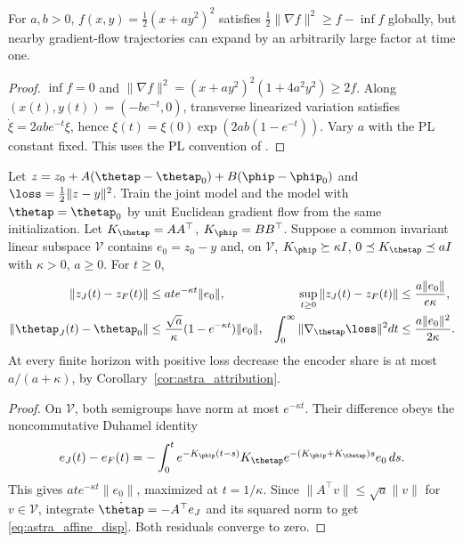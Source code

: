 \begin{proposition}
\label{prop:astra_pl_counter}
For $a,b>0$, $f(x,y)=\frac12(x+ay^2)^2$ satisfies
$\frac12\|\nabla f\|^2\ge f-\inf f$ globally, but nearby gradient-flow
trajectories can expand by an arbitrarily large factor at time one.
\end{proposition}
\begin{proof}
$\inf f=0$ and $\|\nabla f\|^2=(x+ay^2)^2(1+4a^2y^2)\ge2f$.
Along $(x(t),y(t))=(-be^{-t},0)$, transverse linearized variation satisfies
$\dot\xi=2abe^{-t}\xi$, hence
$\xi(t)=\xi(0)\exp(2ab(1-e^{-t}))$. Vary $a$ with the PL constant fixed.
This uses the PL convention of \citet{astra_karimi2016}.
\end{proof}

\begin{theorem}
\label{thm:astra_affine}
Let $z=z_0+A(\thetap-\thetap_0)+B(\phip-\phip_0)$ and
$\loss=\frac12\|z-y\|^2$. Train the joint model and the model with
$\thetap=\thetap_0$ by unit Euclidean gradient flow from the same
initialization. Let $K_\thetap=AA^\top$, $K_\phip=BB^\top$.
Suppose a common invariant linear subspace $\mathcal V$ contains
$e_0=z_0-y$ and, on $\mathcal V$,
$K_\phip\succeq\kappa I$, $0\preceq K_\thetap\preceq aI$ with
$\kappa>0$, $a\ge0$. For $t\ge0$,
\begin{align}
 \|z_J(t)-z_F(t)\|&\le at e^{-\kappa t}\|e_0\|,
 &\sup_{t\ge0}\|z_J(t)-z_F(t)\|&\le\frac{a\|e_0\|}{e\kappa},
 \label{eq:astra_affine_gap}\\
 \|\thetap_J(t)-\thetap_0\|&\le
 \frac{\sqrt a}{\kappa}(1-e^{-\kappa t})\|e_0\|,
 &\int_0^\infty\|\nabla_\thetap\loss\|^2dt&\le
 \frac{a\|e_0\|^2}{2\kappa}.\label{eq:astra_affine_disp}
\end{align}
At every finite horizon with positive loss decrease the encoder share
is at most $a/(a+\kappa)$, by Corollary~\ref{cor:astra_attribution}.
\end{theorem}
\begin{proof}
On $\mathcal V$, both semigroups have norm at most $e^{-\kappa t}$.
Their difference obeys the noncommutative Duhamel identity
\[
 e_J(t)-e_F(t)=-\int_0^t e^{-K_\phip(t-s)}K_\thetap
                e^{-(K_\phip+K_\thetap)s}e_0\,ds.
\]
This gives $at e^{-\kappa t}\|e_0\|$, maximized at $t=1/\kappa$.
Since $\|A^\top v\|\le\sqrt a\|v\|$ for $v\in\mathcal V$,
integrate $\dot\thetap=-A^\top e_J$ and its squared norm to get
\eqref{eq:astra_affine_disp}. Both residuals converge to zero.
\end{proof}

